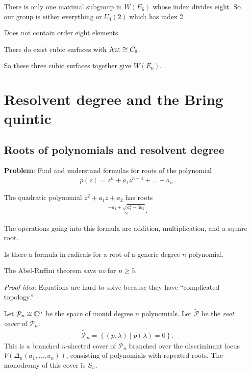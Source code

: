 \documentclass[11pt]{amsart}
\let\til\widetilde
\begin{document}
\begin{fact} There is only one maximal subgroup in $W(E_6)$ whose index divides eight. So our group is either everything or $U_4(2)$ which has index 2.
\end{fact}

\begin{fact} Does not contain order eight elements.
\end{fact}

There do exist cubic surfaces with $\mathrm{Aut} \cong C_8$.

So these three cubic surfaces together give $W(E_6)$.

\section{Resolvent degree and the Bring quintic}

\subsection{Roots of polynomials and resolvent degree}

\textbf{Problem}: Find and understand formulas for roots of the polynomial
\begin{align*}
    p(z) = z^n + a_1 z^{n-1} + \ldots + a_n.
\end{align*}
%

\begin{example} The quadratic polynomial $z^2 + a_1 z +a_2$ has roots
\begin{align*}
    \frac{-a_1 \pm \sqrt{a_1^2- 4a_2}}{2}.
\end{align*}
\end{example}
The operations going into this formula are addition, multiplication, and a square root.

\begin{question} Is there a formula in radicals for a root of a generic degree $n$ polynomial.
\end{question}

The Abel-Ruffini theorem says \emph{no} for $n\ge 5$.

\textit{Proof idea}: Equations are hard to solve because they have ``complicated topology.''

Let $\mathcal{P}_n \cong \mathbb{C}^n$ be the space of monid degree $n$ polynomials. Let $\til{\mathcal{P}}$ be the \textit{root cover} of $\mathcal{P}_n$:
\begin{align*}
    \til{\mathcal{P}}_n = \left\{ (p,\lambda) \mid p(\lambda) = 0 \right\}.
\end{align*}
This is a branched $n$-sheeted cover of $\mathcal{P}_n$ branched over the discriminant locus $V(\Delta_n(a_1, \ldots, a_n))$, consisting of polynomials with repeated roots. The monodromy of this cover is $S_n$.
\end{document}

